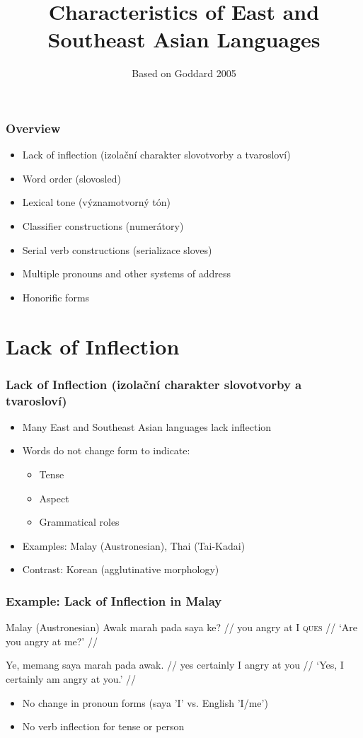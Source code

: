 \documentclass{beamer}
\title{Characteristics of East and Southeast Asian Languages}
\author{Based on Goddard 2005}
\date{}
\begin{document}
\frame{\titlepage}

\begin{frame}
\frametitle{Overview}
\begin{itemize}
\item Lack of inflection (izolační charakter slovotvorby a tvarosloví)
\item Word order (slovosled)
\item Lexical tone (významotvorný tón)
\item Classifier constructions (numerátory)
\item Serial verb constructions (serializace sloves)
\item Multiple pronouns and other systems of address
\item Honorific forms
\end{itemize}
\end{frame}

\section{Lack of Inflection}

\begin{frame}
\frametitle{Lack of Inflection (izolační charakter slovotvorby a tvarosloví)}
\begin{itemize}
\item Many East and Southeast Asian languages lack inflection
\item Words do not change form to indicate:
  \begin{itemize}
  \item Tense
  \item Aspect
  \item Grammatical roles
  \end{itemize}
\item Examples: Malay (Austronesian), Thai (Tai-Kadai)
\item Contrast: Korean (agglutinative morphology)
\end{itemize}
\end{frame}

\begin{frame}
\frametitle{Example: Lack of Inflection in Malay}
\begin{exampleblock}{Malay (Austronesian)}
  \pex
  \a \begingl
\gla Awak marah pada saya ke? //
\glb you angry at I \textsc{ques} //
\glft `Are you angry at me?' //
\endgl

\a \begingl
\gla Ye, memang saya marah pada awak. //
\glb yes certainly I angry at you //
\glft `Yes, I certainly am angry at you.' //
\endgl
\xe
\end{exampleblock}
\begin{itemize}
\item No change in pronoun forms (saya 'I' vs. English 'I/me')
\item No verb inflection for tense or person
\end{itemize}
\end{frame}
\end{document}
